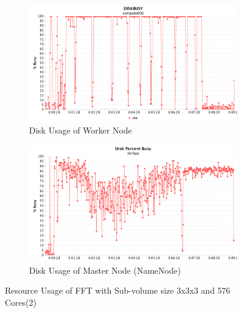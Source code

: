 \begin{figure}[!ht]
\centering
\begin{subfigure}{1\textwidth}
  \centering
  \includegraphics[width=1\linewidth]{figures/FFT131_576_DISK.png}
  \caption{Disk Usage of Worker Node}
  \label{FFT131_576_DISK}
\end{subfigure}
\begin{subfigure}{1\textwidth}
  \centering
  \includegraphics[width=1\linewidth]{figures/FFT131_576_DISK_Master.png}
  \caption{Disk Usage of Master Node (NameNode)}
  \label{FFT131_576_DISK_Master}
\end{subfigure}
\caption{Resource Usage of FFT with Sub-volume size 3x3x3 and 576 Cores(2)}
\label{FFT131_576_2}
\end{figure}



